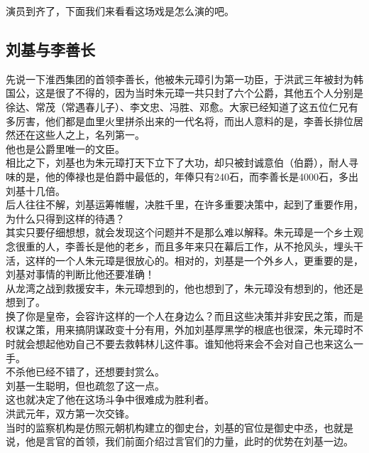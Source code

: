\begin{multicols}{\theparacolNo}
演员到齐了，下面我们来看看这场戏是怎么演的吧。\\

\subsection{刘基与李善长}
先说一下淮西集团的首领李善长，他被朱元璋引为第一功臣，于洪武三年被封为韩国公，这是很了不得的，因为当时朱元璋一共只封了六个公爵，其他五个人分别是徐达、常茂（常遇春儿子）、李文忠、冯胜、邓愈。大家已经知道了这五位仁兄有多厉害，他们都是血里火里拼杀出来的一代名将，而出人意料的是，李善长排位居然还在这些人之上，名列第一。\\

他也是公爵里唯一的文臣。\\

相比之下，刘基也为朱元璋打天下立下了大功，却只被封诚意伯（伯爵），耐人寻味的是，他的俸禄也是伯爵中最低的，年俸只有240石，而李善长是4000石，多出刘基十几倍。\\

后人往往不解，刘基运筹帷幄，决胜千里，在许多重要决策中，起到了重要作用，为什么只得到这样的待遇？\\

其实只要仔细想想，就会发现这个问题并不是那么难以解释。朱元璋是一个乡土观念很重的人，李善长是他的老乡，而且多年来只在幕后工作，从不抢风头，埋头干活，这样的一个人朱元璋是很放心的。相对的，刘基是一个外乡人，更重要的是，刘基对事情的判断比他还要准确！\\

从龙湾之战到救援安丰，朱元璋想到的，他也想到了，朱元璋没有想到的，他还是想到了。\\

换了你是皇帝，会容许这样的一个人在身边么？而且这些决策并非安民之策，而是权谋之策，用来搞阴谋政变十分有用，外加刘基厚黑学的根底也很深，朱元璋时不时就会想起他劝自己不要去救韩林儿这件事。谁知他将来会不会对自己也来这么一手。\\

不杀他已经不错了，还想要封赏么。\\

刘基一生聪明，但也疏忽了这一点。\\

这也就决定了他在这场斗争中很难成为胜利者。\\

洪武元年，双方第一次交锋。\\

当时的监察机构是仿照元朝机构建立的御史台，刘基的官位是御史中丞，也就是说，他是言官的首领，我们前面介绍过言官们的力量，此时的优势在刘基一边。\\


\end{multicols}
